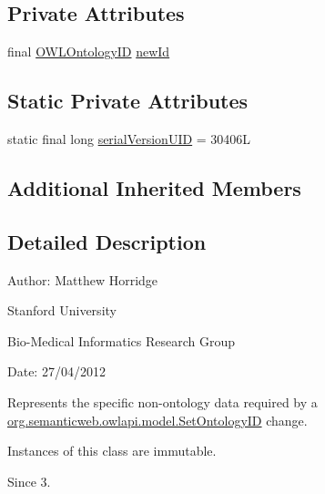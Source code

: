 \subsection*{Private Attributes}
\begin{DoxyCompactItemize}
\item 
final \hyperlink{classorg_1_1semanticweb_1_1owlapi_1_1model_1_1_o_w_l_ontology_i_d}{O\-W\-L\-Ontology\-I\-D} \hyperlink{classorg_1_1semanticweb_1_1owlapi_1_1change_1_1_set_ontology_i_d_data_acbb6b0c41d0a5dfe7a7ae7388dd25f49}{new\-Id}
\end{DoxyCompactItemize}
\subsection*{Static Private Attributes}
\begin{DoxyCompactItemize}
\item 
static final long \hyperlink{classorg_1_1semanticweb_1_1owlapi_1_1change_1_1_set_ontology_i_d_data_a08d57f749a102e283cbb1ce1d4a122fa}{serial\-Version\-U\-I\-D} = 30406\-L
\end{DoxyCompactItemize}
\subsection*{Additional Inherited Members}


\subsection{Detailed Description}
Author\-: Matthew Horridge\par
 Stanford University\par
 Bio-\/\-Medical Informatics Research Group\par
 Date\-: 27/04/2012 

Represents the specific non-\/ontology data required by a \hyperlink{classorg_1_1semanticweb_1_1owlapi_1_1model_1_1_set_ontology_i_d}{org.\-semanticweb.\-owlapi.\-model.\-Set\-Ontology\-I\-D} change. 

Instances of this class are immutable. 

\begin{DoxySince}{Since}
3. 
\end{DoxySince}


